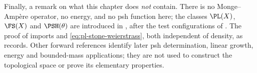 Finally, a remark on what this chapter does \emph{not} contain.  There is no
Monge--Amp\`ere operator, no energy, and no psh function here; the classes
$\PL(X)$, $\FS(X)$ and $\PSH(\theta)$ are introduced in
, after the test configurations of
.  The proof of  imports
 and \eqref{eq:pl-stone-weierstrass},
both independent of density, as 
records.  Other forward references identify later psh determination,
linear growth, energy and bounded-mass applications; they are not used
to construct the topological space or prove its elementary properties.
